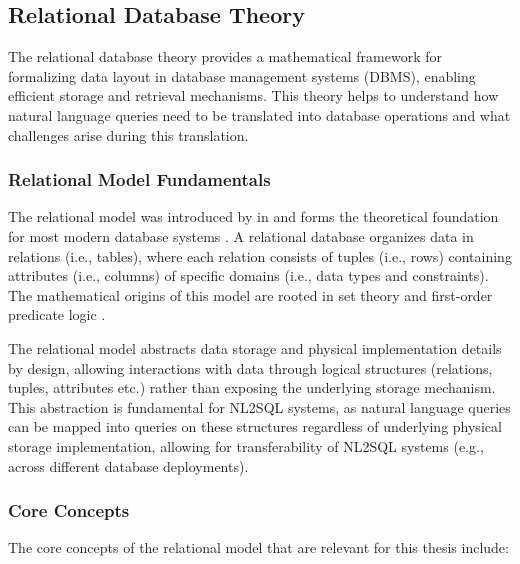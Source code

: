 \subsection{Relational Database Theory}

The relational database theory provides a mathematical framework for
formalizing data layout in database management systems (DBMS), enabling
efficient storage and retrieval mechanisms. This theory helps to understand how
natural language queries need to be translated into database operations and
what challenges arise during this translation.

\subsubsection{Relational Model Fundamentals}

The relational model was introduced by \citeauthor{RelationalModel} in
\citeyear{RelationalModel} and forms the theoretical foundation for most modern
database systems \citep{RelationalModel, Rendezvous}. A relational database
organizes data in relations (i.e., tables), where each relation consists of
tuples (i.e., rows) containing attributes (i.e., columns) of specific domains
(i.e., data types and constraints). The mathematical origins of this model are
rooted in set theory and first-order predicate logic \citep{RelationalModel,
DatabaseSystemIntro}.

The relational model abstracts data storage and physical implementation details
by design, allowing interactions with data through logical structures
(relations, tuples, attributes etc.) rather than exposing the underlying
storage mechanism. This abstraction is fundamental for NL2SQL systems, as
natural language queries can be mapped into queries on these structures
regardless of underlying physical storage implementation, allowing for
transferability of NL2SQL systems (e.g., across different database
deployments).

\subsubsection{Core Concepts}

The core concepts of the relational model that are relevant for this thesis
include:

